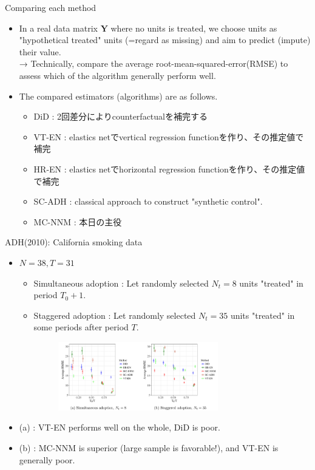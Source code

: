 \documentclass[xcolor=svgnames,aspectratio=169]{beamer}
\begin{document}
\begin{frame}{Comparing each method}
    \begin{itemize}
        \item In a real data matrix $\mathbf{Y}$ where \alert{no units is treated}, we choose units as "hypothetical treated" units (=regard as missing) and aim to predict (impute) their value. \\
        → Technically, compare the average root-mean-squared-error(RMSE) to assess which of the algorithm generally perform well.
        \item The compared estimators (algorithms) are as follows.
        \begin{itemize}
            \item DiD : 2回差分によりcounterfactualを補完する
            \item VT-EN : elastics netでvertical regression functionを作り、その推定値で補完
            \item HR-EN : elastics netでhorizontal regression functionを作り、その推定値で補完
            \item SC-ADH : classical approach to construct "synthetic control".
            \item MC-NNM : 本日の主役
        \end{itemize}
    \end{itemize}
\end{frame}

\begin{frame}{ADH(2010): California smoking data}
    \begin{itemize}
        \item $N=38, T=31$
        \begin{itemize}
            \item Simultaneous adoption : Let randomly selected $N_t=8$ units "treated" in period $T_0+1$.
            \item Staggered adoption : Let randomly selected $N_t=35$ units "treated" in some periods after period $T$.
            \begin{figure}
            \includegraphics[width=0.7\textwidth, height=0.4\textheight, keepaspectratio]{ADH.png}
            \end{figure}
        \end{itemize}
        \item (a) : VT-EN performs well on the whole, DiD is poor.
        \item (b) : MC-NNM is superior (large sample is favorable!), and VT-EN is generally poor.
    \end{itemize}
\end{frame}
\end{document}
